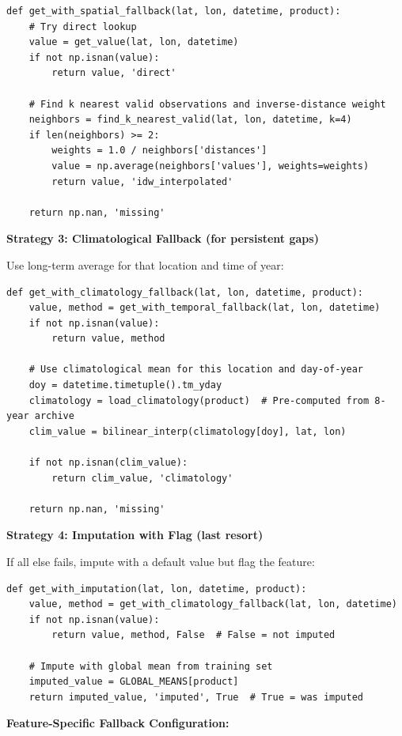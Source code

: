 \documentclass[11pt]{article}
\begin{document}
\begin{verbatim}
def get_with_spatial_fallback(lat, lon, datetime, product):
    # Try direct lookup
    value = get_value(lat, lon, datetime)
    if not np.isnan(value):
        return value, 'direct'

    # Find k nearest valid observations and inverse-distance weight
    neighbors = find_k_nearest_valid(lat, lon, datetime, k=4)
    if len(neighbors) >= 2:
        weights = 1.0 / neighbors['distances']
        value = np.average(neighbors['values'], weights=weights)
        return value, 'idw_interpolated'

    return np.nan, 'missing'
\end{verbatim}

\textbf{Strategy 3: Climatological Fallback (for persistent gaps)}

Use long-term average for that location and time of year:

\begin{verbatim}
def get_with_climatology_fallback(lat, lon, datetime, product):
    value, method = get_with_temporal_fallback(lat, lon, datetime)
    if not np.isnan(value):
        return value, method

    # Use climatological mean for this location and day-of-year
    doy = datetime.timetuple().tm_yday
    climatology = load_climatology(product)  # Pre-computed from 8-year archive
    clim_value = bilinear_interp(climatology[doy], lat, lon)

    if not np.isnan(clim_value):
        return clim_value, 'climatology'

    return np.nan, 'missing'
\end{verbatim}

\textbf{Strategy 4: Imputation with Flag (last resort)}

If all else fails, impute with a default value but flag the feature:

\begin{verbatim}
def get_with_imputation(lat, lon, datetime, product):
    value, method = get_with_climatology_fallback(lat, lon, datetime)
    if not np.isnan(value):
        return value, method, False  # False = not imputed

    # Impute with global mean from training set
    imputed_value = GLOBAL_MEANS[product]
    return imputed_value, 'imputed', True  # True = was imputed
\end{verbatim}

\textbf{Feature-Specific Fallback Configuration:}
\end{document}
